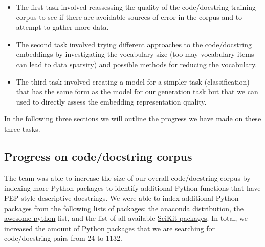 \documentclass[article, 12pt, oneside]{memoir}
\begin{document}
\begin{itemize}
\item
  The first task involved reassessing the quality of the code/docstring
  training corpus to see if there are avoidable sources of error in the
  corpus and to attempt to gather more data.
\item
  The second task involved trying different approaches to the
  code/docstring embeddings by investigating the vocabulary size (too
  may vocabulary items can lead to data sparsity) and possible methods
  for reducing the vocabulary.
\item
  The third task involved creating a model for a simpler task
  (classification) that has the same form as the model for our
  generation task but that we can used to directly assess the embedding
  representation quality.
\end{itemize}

In the following three sections we will outline the progress we have
made on these three tasks.

\hypertarget{progress-on-codedocstring-corpus}{%
\subsection{Progress on code/docstring
corpus}\label{progress-on-codedocstring-corpus}}

The team was able to increase the size of our overall code/docstring
corpus by indexing more Python packages to identify additional Python
functions that have PEP-style descriptive docstrings. We were able to
index additional Python packages from the following lists of packages:
the
\href{https://docs.anaconda.com/anaconda/packages/py3.6_osx-64/}{anaconda
distribution}, the
\href{https://github.com/vinta/awesome-python}{awesome-python} list, and
the list of all available
\href{http://scikits.appspot.com/scikits}{SciKit packages}. In total, we
increased the amount of Python packages that we are searching for
code/docstring pairs from 24 to 1132.
\end{document}
